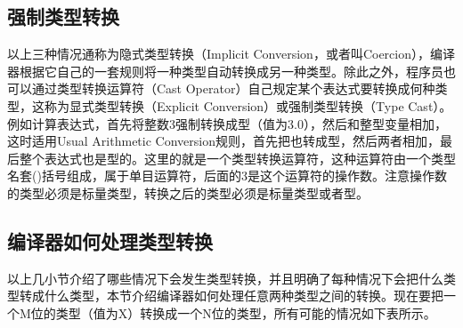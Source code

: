 \subsection{强制类型转换}
%


以上三种情况通称为隐式类型转换（Implicit Conversion，或者叫Coercion），编译器根据它自己的一套规则将一种类型自动转换成另一种类型。除此之外，程序员也可以通过类型转换运算符（Cast Operator）自己规定某个表达式要转换成何种类型，这称为显式类型转换（Explicit Conversion）或强制类型转换（Type Cast）。例如计算表达式，首先将整数3强制转换成型（值为3.\BookSplit{}0），然后和整型变量相加，这时适用Usual Arithmetic Conversion规则，首先把也转成型，然后两者相加，最后整个表达式也是型的。这里的就是一个类型转换运算符，这种运算符由一个类型名套()括号组成，属于单目运算符，后面的3是这个运算符的操作数。注意操作数的类型必须是标量类型，转换之后的类型必须是标量类型或者型。


\subsection{编译器如何处理类型转换}
%


以上几小节介绍了哪些情况下会发生类型转换，并且明确了每种情况下会把什么类型转成什么类型，本节介绍编译器如何处理任意两种类型之间的转换。现在要把一个M位的类型（值为X）转换成一个N位的类型，所有可能的情况如下表所示。


